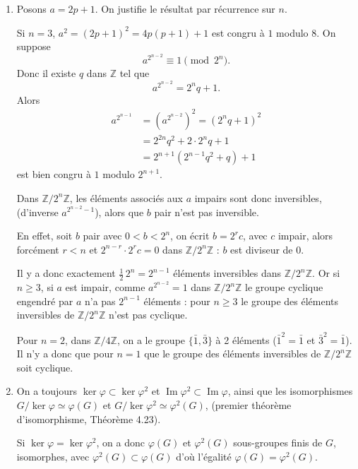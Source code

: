 \begin{enumerate}[label=\arabic*.,leftmargin=2.2em,itemsep=1.2em]
\item Posons $a=2p+1$. On justifie le résultat par récurrence sur $n$.

Si $n=3$, $a^2=(2p+1)^2=4p(p+1)+1$ est congru à $1$ modulo $8$. On suppose
\[
a^{2^{n-2}}\equiv1\pmod{2^n}.
\]
Donc il existe $q$ dans $\mathbb Z$ tel que
\[
a^{2^{n-2}}=2^nq+1.
\]
Alors
\begin{align*}
a^{2^{n-1}}
&=\left(a^{2^{n-2}}\right)^2=(2^nq+1)^2\\
&=2^{2n}q^2+2\cdot2^nq+1\\
&=2^{n+1}\left(2^{n-1}q^2+q\right)+1
\end{align*}
est bien congru à $1$ modulo $2^{n+1}$.

Dans $\mathbb Z/2^n\mathbb Z$, les éléments associés aux $a$ impairs sont donc inversibles, (d'inverse $a^{2^{n-2}-1}$), alors que $b$ pair n'est pas inversible.

En effet, soit $b$ pair avec $0<b<2^n$, on écrit $b=2^r c$, avec $c$ impair, alors forcément $r<n$ et $2^{n-r}\cdot2^rc=0$ dans $\mathbb Z/2^n\mathbb Z$ : $b$ est diviseur de 0.

Il y a donc exactement $\frac12\,2^n=2^{n-1}$ éléments inversibles dans $\mathbb Z/2^n\mathbb Z$. Or si $n\ge3$, si $a$ est impair, comme $a^{2^{n-2}}=1$ dans $\mathbb Z/2^n\mathbb Z$ le groupe cyclique engendré par $a$ n'a pas $2^{n-1}$ éléments : pour $n\ge3$ le groupe des éléments inversibles de $\mathbb Z/2^n\mathbb Z$ n'est pas cyclique.

Pour $n=2$, dans $\mathbb Z/4\mathbb Z$, on a le groupe $\{\bar1,\bar3\}$ à 2 éléments  ($\bar1^2=\bar1$ et $\bar3^2=\bar1$). Il n'y a donc que pour $n=1$  que le groupe des éléments inversibles de $\mathbb Z/2^n\mathbb Z$ soit cyclique.

\item On a toujours $\ker\varphi\subset\ker\varphi^2$ et $\operatorname{Im}\varphi^2\subset\operatorname{Im}\varphi$, ainsi que les isomorphismes $G/\ker\varphi\simeq\varphi(G)$ et $G/\ker\varphi^2\simeq\varphi^2(G)$, (premier théorème d'isomorphisme, Théorème 4.23).

Si $\ker\varphi=\ker\varphi^2$, on a donc $\varphi(G)$ et $\varphi^2(G)$ sous-groupes finis de $G$, isomorphes, avec $\varphi^2(G)\subset\varphi(G)$ d'où l'égalité $\varphi(G)=\varphi^2(G)$.


\end{enumerate}
